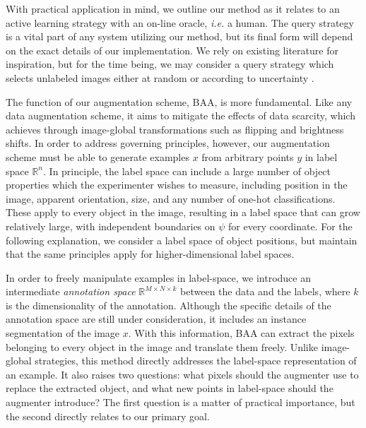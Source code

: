 \documentclass[10pt, draftcls]{IEEEtran}
\begin{document}
With practical application in mind, we outline our method as it relates to an
active learning strategy with an on-line oracle, \emph{i.e.} a human. The query
strategy is a vital part of any system utilizing our method, but its final form
will depend on the exact details of our implementation. We rely on existing
literature for inspiration, but for the time being, we may consider a query
strategy which selects unlabeled images either at random or according to
uncertainty \cite{settles_active_2012, vezhnevets_active_2012}.

The function of our augmentation scheme, BAA, is more fundamental. Like any data
augmentation scheme, it aims to mitigate the effects of data scarcity, which
\cite{krizhevsky_imagenet_2012} achieves through image-global transformations
such as flipping and brightness shifts. In order to address governing
principles, however, our augmentation scheme must be able to generate examples
$x$ from arbitrary points $y$ in label space $\mathbb{R}^n$. In principle, the
label space can include a large number of object properties which the
experimenter wishes to measure, including position in the image, apparent
orientation, size, and any number of one-hot classifications. These apply to
every object in the image, resulting in a label space that can grow relatively
large, with independent boundaries on $\psi$ for every coordinate. For the
following explanation, we consider a label space of object positions, but
maintain that the same principles apply for higher-dimensional label spaces.

In order to freely manipulate examples in label-space, we introduce an
intermediate \emph{annotation space} $\mathbb{R}^{M\times N \times k}$ between
the data and the labels, where $k$ is the dimensionality of the
annotation. Although the specific details of the annotation space are still
under consideration, it includes an instance segmentation of the image $x$. With
this information, BAA can extract the pixels belonging to every object in the
image and translate them freely. Unlike image-global strategies, this method
directly addresses the label-space representation of an example. It also raises
two questions: what pixels should the augmenter use to replace the extracted
object, and what new points in label-space should the augmenter introduce? The
first question is a matter of practical importance, but the second directly
relates to our primary goal.
\end{document}
